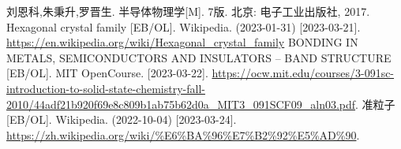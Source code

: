 \begin{thebibliography}{99}%
     刘恩科,朱秉升,罗晋生. 半导体物理学[M]. 7版. 北京: 电子工业出版社, 2017.
     Hexagonal crystal family [EB/OL]. Wikipedia. (2023-01-31) [2023-03-21].\\ \url{https://en.wikipedia.org/wiki/Hexagonal_crystal_family}
     BONDING IN METALS, SEMICONDUCTORS AND
    INSULATORS – BAND STRUCTURE [EB/OL]. MIT OpenCourse. [2023-03-22]. \url{https://ocw.mit.edu/courses/3-091sc-introduction-to-solid-state-chemistry-fall-2010/44adf21b920f69e8c809b1ab75b62d0a_MIT3_091SCF09_aln03.pdf}.
     准粒子 [EB/OL]. Wikipedia. (2022-10-04) [2023-03-24].\\ \url{https://zh.wikipedia.org/wiki/%E6%BA%96%E7%B2%92%E5%AD%90}.
\end{thebibliography}
